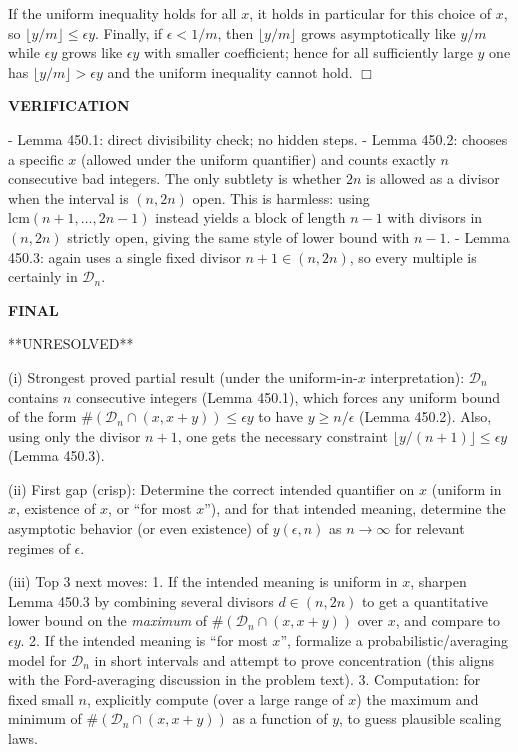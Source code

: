 If the uniform inequality holds for all $x$, it holds in particular for this choice of $x$, so $\lfloor y/m\rfloor\le \epsilon y$.
Finally, if $\epsilon<1/m$, then $\lfloor y/m\rfloor$ grows asymptotically like $y/m$ while $\epsilon y$ grows like $\epsilon y$ with smaller coefficient; hence for all sufficiently large $y$ one has $\lfloor y/m\rfloor>\epsilon y$ and the uniform inequality cannot hold. \hfill$\Box$

\medskip
\noindent\textbf{VERIFICATION}

- Lemma 450.1: direct divisibility check; no hidden steps.
- Lemma 450.2: chooses a specific $x$ (allowed under the uniform quantifier) and counts exactly $n$ consecutive bad integers. The only subtlety is whether $2n$ is allowed as a divisor when the interval is $(n,2n)$ open. This is harmless: using $\mathrm{lcm}(n+1,\dots,2n-1)$ instead yields a block of length $n-1$ with divisors in $(n,2n)$ strictly open, giving the same style of lower bound with $n-1$.
- Lemma 450.3: again uses a single fixed divisor $n+1\in(n,2n)$, so every multiple is certainly in $\mathcal D_n$.

\medskip
\noindent\textbf{FINAL}

**UNRESOLVED**

(i) Strongest proved partial result (under the uniform-in-$x$ interpretation): $\mathcal D_n$ contains $n$ consecutive integers (Lemma 450.1), which forces any uniform bound of the form $\#(\mathcal D_n\cap(x,x+y))\le \epsilon y$ to have $y\ge n/\epsilon$ (Lemma 450.2). Also, using only the divisor $n+1$, one gets the necessary constraint $\lfloor y/(n+1)\rfloor\le \epsilon y$ (Lemma 450.3).

(ii) First gap (crisp): Determine the correct intended quantifier on $x$ (uniform in $x$, existence of $x$, or ``for most $x$''), and for that intended meaning, determine the asymptotic behavior (or even existence) of $y(\epsilon,n)$ as $n\to\infty$ for relevant regimes of $\epsilon$.

(iii) Top 3 next moves:
1. If the intended meaning is uniform in $x$, sharpen Lemma 450.3 by combining several divisors $d\in(n,2n)$ to get a quantitative lower bound on the \emph{maximum} of $\#(\mathcal D_n\cap(x,x+y))$ over $x$, and compare to $\epsilon y$.
2. If the intended meaning is ``for most $x$'', formalize a probabilistic/averaging model for $\mathcal D_n$ in short intervals and attempt to prove concentration (this aligns with the Ford-averaging discussion in the problem text).
3. Computation: for fixed small $n$, explicitly compute (over a large range of $x$) the maximum and minimum of $\#(\mathcal D_n\cap(x,x+y))$ as a function of $y$, to guess plausible scaling laws.

